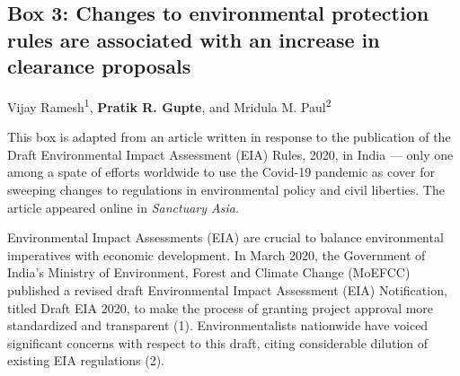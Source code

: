 
\begin{refsection}
\newrefcontext[sorting=ynt]
\pagestyle{plain}
\pagecolor{Snow2}

	\medskip
	\section*{Box 3: Changes to environmental protection rules are associated with an increase in clearance proposals}\label{box:clearances}

	\noindent Vijay Ramesh\textsuperscript{1}, \textbf{Pratik R. Gupte}, and Mridula M. Paul\textsuperscript{2}


	\medskip

	\noindent {{$\Delta$}} {\footnotesize This box is adapted from an article written in response to the publication of the Draft Environmental Impact Assessment (EIA) Rules, 2020, in India --- only one among a spate of efforts worldwide to use the Covid-19 pandemic as cover for sweeping changes to regulations in environmental policy and civil liberties.
	The article appeared online in \textit{Sanctuary Asia}.}

	\medskip

	Environmental Impact Assessments (EIA) are crucial to balance environmental imperatives with economic development.  
	In March 2020, the Government of India’s Ministry of Environment, Forest and Climate Change (MoEFCC) published a revised draft Environmental Impact Assessment (EIA) Notification, titled Draft EIA 2020, to make the process of granting project approval more standardized and transparent (1). 
	Environmentalists nationwide have voiced significant concerns with respect to this draft, citing considerable dilution of existing EIA regulations (2). 


\end{refsection}
